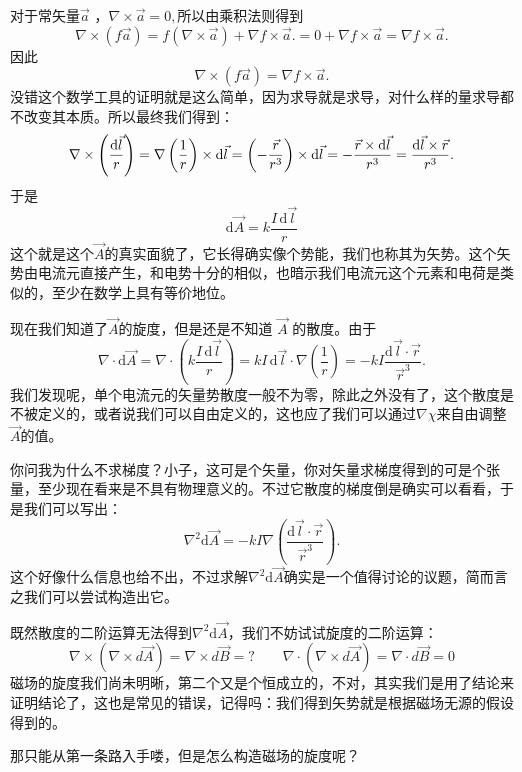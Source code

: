 \documentclass[UTF8]{ctexbook}
\begin{document}
对于常矢量\(\vec{a}\) ，$\nabla\times\vec{a}=0,$所以由乘积法则得到
\[
\nabla\times(f\vec{a})
=f(\nabla\times\vec{a})+\nabla f\times\vec{a}.=0+\nabla f\times\vec{a}=\nabla f\times\vec{a}.
\]
因此
\[
\boxed{
\nabla\times(f\vec{a})=\nabla f\times\vec{a}.
}
\]
没错这个数学工具的证明就是这么简单，因为求导就是求导，对什么样的量求导都不改变其本质。所以最终我们得到：
\[
\nabla\times\left(\frac{\mathrm d\vec{l}}{r}\right)=
\nabla\left(\frac1r\right)\times\mathrm d\vec{l}\\=
\left(-\frac{\vec{r}}{r^3}\right)\times\mathrm d\vec{l}\\=
-\frac{\vec{r}\times\mathrm d\vec{l}}{r^3}\\=
\frac{\mathrm d\vec{l}\times\vec{r}}{r^3}.
\]
于是
\[
\boxed{
\mathrm d\vec{A}
=k\frac{I\,\mathrm d\vec{l}}{r}
}
\]
这个就是这个$\vec{A}$的真实面貌了，它长得确实像个势能，我们也称其为矢势。这个矢势由电流元直接产生，和电势十分的相似，也暗示我们电流元这个元素和电荷是类似的，至少在数学上具有等价地位。

现在我们知道了$\vec{A}$的旋度，但是还是不知道 \(\vec{A}\) 的散度。由于
\[
\nabla\cdot\mathrm d\vec{A}=
\nabla\cdot\left(k\frac{I\,\mathrm d\vec{l}}{r}\right)=
kI\,\mathrm d\vec{l}\cdot\nabla\left(\frac{1}{r}\right)=
-kI\frac{\mathrm d\vec{l}\cdot\vec{r}}{\vec{r}^3}.
\]
我们发现呢，单个电流元的矢量势散度一般不为零，除此之外没有了，这个散度是不被定义的，或者说我们可以自由定义的，这也应了我们可以通过$\nabla \chi $来自由调整$\vec A$的值。

你问我为什么不求梯度？小子，这可是个矢量，你对矢量求梯度得到的可是个张量，至少现在看来是不具有物理意义的。不过它散度的梯度倒是确实可以看看，于是我们可以写出：
\[
\nabla^2\mathrm d\vec{A}=
-kI\nabla(\frac{\mathrm d\vec{l}\cdot\vec{r}}{\vec{r}^3}).
\]
这个好像什么信息也给不出，不过求解$\nabla^2\mathrm d\vec{A}$确实是一个值得讨论的议题，简而言之我们可以尝试构造出它。

既然散度的二阶运算无法得到$\nabla^2\mathrm d\vec{A}$，我们不妨试试旋度的二阶运算：
\[
\nabla \times(\nabla \times d\vec{A}) =\nabla \times d\vec{B}=?
\qquad
\nabla \cdot(\nabla \times d\vec{A}) =\nabla \cdot d\vec{B}=0
\]
磁场的旋度我们尚未明晰，第二个又是个恒成立的，不对，其实我们是用了结论来证明结论了，这也是常见的错误，记得吗：我们得到矢势就是根据磁场无源的假设得到的。

那只能从第一条路入手喽，但是怎么构造磁场的旋度呢？
\end{document}
